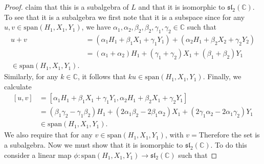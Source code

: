\documentclass[12pt]{article}
\theoremstyle{definition}
\begin{document}
\begin{enumerate}
\begin{enumerate}[label=(\alph*)]
\begin{proof}
                        claim that this is a subalgebra of $L$ and that it is
                        isomorphic to $\mathfrak{sl}_2(\mathbb{C})$. To see
                        that it is a subalgebra we first note that it is
                        a subspace since for any $u, v\in\text{span}(H_1, X_1,
                        Y_1)$, we have $\alpha_1, \alpha_2, \beta_2, \beta_2,
                        \gamma_1, \gamma_2\in \mathbb{C}$ such that 
                        \begin{equation*}
                            \begin{split}
                                u+v &= (\alpha_1 H_1+\beta_1 X_1+\gamma_1
                                Y_1)+(\alpha_2 H_1+\beta_2 X_2+\gamma_2 Y_2) \\
                                &=(\alpha_1+\alpha_2)H_1+(\gamma_1+\gamma_2)X_1
                                +(\beta_1+\beta_2)Y_1\\
                                \in\text{span}(H_1, X_1, Y_1).
                            \end{split}
                        \end{equation*}
                        Similarly, for any $k\in \mathbb{C}$, it follows that
                        $ku\in\text{span}(H_1, X_1, Y_1)$. Finally, we
                        calculate
                        \begin{equation*}
                            \begin{split}
                                [u, v] &= [\alpha_1 H_1+\beta_1 X_1+\gamma_1
                                Y_1, \alpha_2 H_1+\beta_2 X_1+\gamma_2 Y_1] \\
                                &=(\beta_1\gamma_2-\gamma_1\beta_2)H_1+
                                (2\alpha_1\beta_2-2\beta_1\alpha_2)X_1+
                                (2\gamma_1\alpha_2-2\alpha_1\gamma_2)Y_1 \\
                                &\in\text{span}(H_1, X_1, Y_1).
                            \end{split}
                        \end{equation*}
                        We also require that for any $v\in\text{span}(H_1, X_1,
                        Y_1)$, with $v=$Therefore the set is a subalgebra. Now we must show
                        that it is isomorphic to $\mathfrak{sl}_2(\mathbb{C})$.
                        To do this consider a linear map $\phi:\text{span}(H_1, X_1,
                        Y_1)\to\mathfrak{sl}_2(\mathbb{C})$ such that 

\end{proof}
\end{enumerate}
\end{enumerate}
\end{document}
